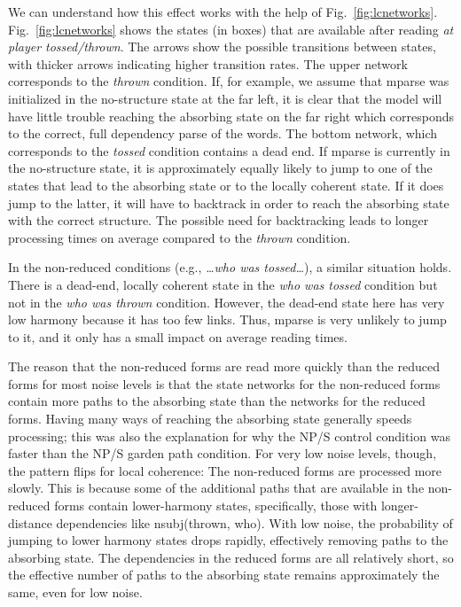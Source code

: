 \documentclass[a4paper, 12pt]{article}
\begin{document}
We can understand how this effect works with the help of
Fig.~\ref{fig:lcnetworks}. Fig.~\ref{fig:lcnetworks} shows the states (in
boxes) that are available after reading \emph{at player tossed/thrown}.
The arrows show the possible transitions between states, with thicker arrows
indicating higher transition rates. The upper network corresponds to the
\emph{thrown} condition. If, for example, we assume that mparse was initialized
in the no-structure state at the far left, it is clear that the model will have
little trouble reaching the absorbing state on the far right which corresponds
to the correct, full dependency parse of the words. The bottom network, which
corresponds to the \emph{tossed} condition contains a dead end. If mparse is
currently in the no-structure state, it is approximately equally likely to jump
to one of the states that lead to the absorbing state or to 
the locally coherent state. If it does jump to the latter, it will have to
backtrack in order to reach the absorbing state with the correct structure.
The possible need for backtracking leads to longer processing times on average
compared to the \emph{thrown} condition.

In the non-reduced conditions (e.g., \emph{\dots who was tossed\dots}), a
similar situation holds. There is a dead-end, locally coherent state in the
\emph{who was tossed} condition but not in the \emph{who was thrown} condition.
However, the dead-end state here has very low harmony because it has too few
links. Thus, mparse is very unlikely to jump to it, and it only has a small
impact on average reading times.

The reason that the non-reduced forms are read more quickly than the reduced
forms for most noise levels is that the state networks for the non-reduced
forms contain more paths to the absorbing state than the networks for the
reduced forms. Having many ways of reaching the absorbing state generally
speeds processing; this was also the explanation for why the NP/S control
condition was faster than the NP/S garden path condition. For very low noise
levels, though, the pattern flips for local coherence: The non-reduced forms are processed more
slowly. This is because some of the additional paths that are available in the
non-reduced forms contain lower-harmony states, specifically, those with
longer-distance dependencies like nsubj(thrown, who). With low noise, the
probability of jumping to lower harmony states drops rapidly, effectively
removing paths to the absorbing state. The dependencies in the reduced
forms are all relatively short, so the effective number of paths to the
absorbing state remains approximately the same, even for low noise.
\end{document}

